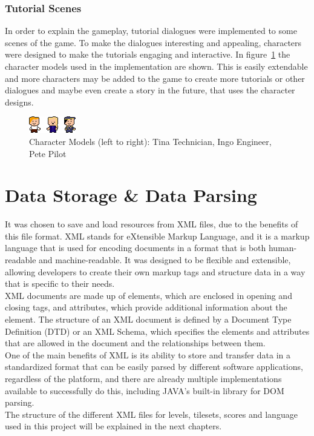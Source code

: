 \subsubsection{Tutorial Scenes}\label{subsubsec:tutorial-scenes}
In order to explain the gameplay, tutorial dialogues were implemented to some scenes of the game.
To make the dialogues interesting and appealing, characters were designed to make the tutorials engaging and interactive.
In figure~\ref{fig:character-models} the character models used in the implementation are shown.
This is easily extendable and more characters may be added to the game to create more tutorials or other dialogues and maybe even create
a story in the future, that uses the character designs.
\begin{figure}
    \centering
    \includegraphics[width=\textwidth]{Pictures/res/implementation/character-models}
    \caption{Character Models (left to right): Tina Technician, Ingo Engineer, Pete Pilot}
    \label{fig:character-models}
\end{figure}

\section{Data Storage \& Data Parsing}\label{sec:data-storage-&-data-parsing}
It was chosen to save and load resources from XML files, due to the benefits of this file format.
XML stands for eXtensible Markup Language, and it is a markup language that is used for encoding documents in a format that is both human-readable and machine-readable.
It was designed to be flexible and extensible, allowing developers to create their own markup tags and structure data in a way that is specific to their needs.
\\
XML documents are made up of elements, which are enclosed in opening and closing tags, and attributes, which provide additional information about the element.
The structure of an XML document is defined by a Document Type Definition (DTD) or an XML Schema, which specifies the elements and attributes that are allowed in the document and the relationships between them.
\\
One of the main benefits of XML is its ability to store and transfer data in a standardized format that can be easily parsed by different software applications, regardless of the platform, and there are
already multiple implementations available to successfully do this, including JAVA's built-in library for DOM parsing.
\\
The structure of the different XML files for levels, tilesets, scores and language used in this project will be explained in the next chapters.
